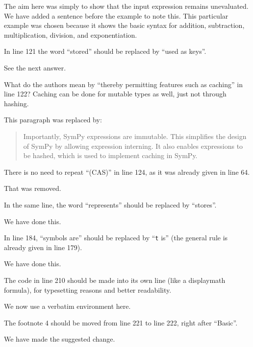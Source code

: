 \documentclass[answers,12pt]{exam}
\begin{document}
\begin{questions}
\begin{solution}
The aim here was simply to show that the input expression remains unevaluated.
We have added a sentence before the example to note this.
This particular example was chosen because it shows the basic syntax for
addition, subtraction, multiplication, division, and exponentiation.
\end{solution}

\question In line 121 the word ``stored'' should be replaced by ``used as keys''.
\begin{solution}
See the next answer.
\end{solution}

\question What do the authors mean by ``thereby permitting features such as caching'' in line 122? Caching can be done for mutable types as well, just not through hashing.
\begin{solution}
This paragraph was replaced by:
\begin{quote}
Importantly, SymPy expressions are immutable. This simplifies the design of
SymPy by allowing expression interning. It also enables expressions to be
hashed, which is used to implement caching in SymPy.
\end{quote}
\end{solution}

\question There is no need to repeat ``(CAS)'' in line 124, as it was already given in line 64.
\begin{solution}
That was removed.
\end{solution}

\question In the same line, the word ``represents'' should be replaced by ``stores''.
\begin{solution}
We have done this.
\end{solution}

\question In line 184, ``symbols are'' should be replaced by ``\texttt{t} is'' (the general rule is already given in line 179).
\begin{solution}
We have done this.
\end{solution}

\question The code in line 210 should be made into its own line (like a displaymath formula), for typesetting reasons and better readability.
\begin{solution}
We now use a verbatim environment here.
\end{solution}

\question The footnote 4 should be moved from line 221 to line 222, right after ``Basic''.
\label{rev3point16}
\begin{solution}
We have made the suggested change.
\end{solution}


\end{questions}
\end{document}
